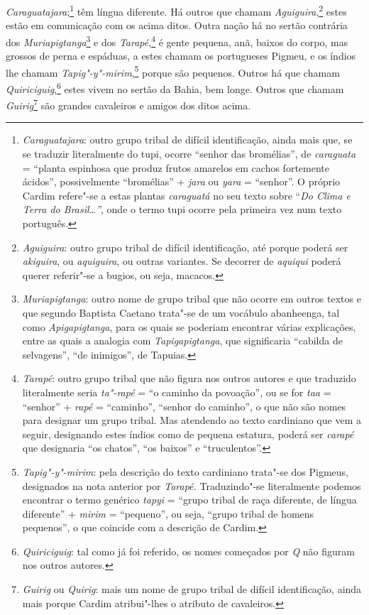 \textit{Caraguatajara};\footnote{ \textit{Caraguatajara}: outro grupo
tribal de difícil identificação, ainda mais que, se se traduzir
literalmente do tupi, ocorre ``senhor das bromélias'', de
\textit{caraguata} = ``planta espinhosa que produz frutos amarelos em
cachos fortemente ácidos'', possivelmente ``bromélias'' + \textit{jara} ou
\textit{yara} = ``senhor''. O próprio Cardim refere"-se a estas plantas
\textit{caraguatá} no seu texto sobre ``\textit{Do Clima e Terra do
Brasil\ldots''}, onde o termo tupi ocorre pela primeira vez num texto
português.} têm língua diferente. Há outros que chamam
\textit{Aguiguira},\footnote{ \textit{Aguiguira}: outro grupo tribal
de difícil identificação, até porque poderá ser \textit{akiguira}, ou
\textit{aquiguira}, ou outras variantes. Se decorrer de
\textit{aquiqui} poderá querer referir"-se a bugios, ou seja,
macacos.} estes estão em comunicação com os acima ditos. Outra
nação há no sertão contrária dos \textit{Muriapigtanga}\footnote{ \textit{Muriapigtanga}: 
outro nome de grupo tribal que não ocorre em
outros textos e que segundo Baptista Caetano trata"-se de um vocábulo
abanheenga, tal como \textit{Apigapigtanga}, para os quais se poderiam
encontrar várias explicações, entre as quais a analogia com
\textit{Tapigapigtanga}, que significaria ``cabilda de selvagens'', ``de
inimigos'', de Tapuias.} e dos 
\textit{Tarapé},\footnote{ \textit{Tarapé}: outro grupo tribal que não figura nos
outros autores e que traduzido literalmente seria \textit{ta"-rapé} = 
``o caminho da povoação'', ou se for \textit{taa} = ``senhor'' +
\textit{rapé} = ``caminho'', ``senhor do caminho'', o que não são nomes
para designar um grupo tribal. Mas atendendo ao texto cardiniano que
vem a seguir, designando estes índios como de pequena estatura, poderá
ser \textit{carapé} que designaria ``os chatos'', ``os baixos'' e
``truculentos''.} é gente pequena, anã, baixos do corpo, mas grossos de
perna e espáduas, a estes chamam os portugueses Pigmeu, e os índios lhe
chamam \textit{Tapig"-y"-mirim},\footnote{ \textit{Tapig"-y"-mirim}: pela
descrição do texto cardiniano trata"-se dos Pigmeus, designados na nota
anterior por \textit{Tarapé.} Traduzindo"-se literalmente podemos
encontrar o termo genérico \textit{tapyi} = ``grupo tribal de raça
diferente, de língua diferente'' + \textit{mirim} = ``pequeno'', ou seja,
``grupo tribal de homens pequenos'', o que coincide com a descrição de
Cardim.} porque são pequenos. Outros há que chamam
\textit{Quiriciguig},\footnote{ \textit{Quiriciguig}: tal como já foi
referido, os nomes começados por \textit{Q} não figuram nos outros
autores.} estes vivem no sertão da Bahia, bem longe. Outros
que chamam \textit{Guirig}\footnote{ \textit{Guirig} ou \textit{Quirig}:  
mais um nome de grupo tribal de difícil identificação, ainda mais
porque Cardim atribui"-lhes o atributo de cavaleiros.} são
grandes cavaleiros e amigos dos ditos acima.

